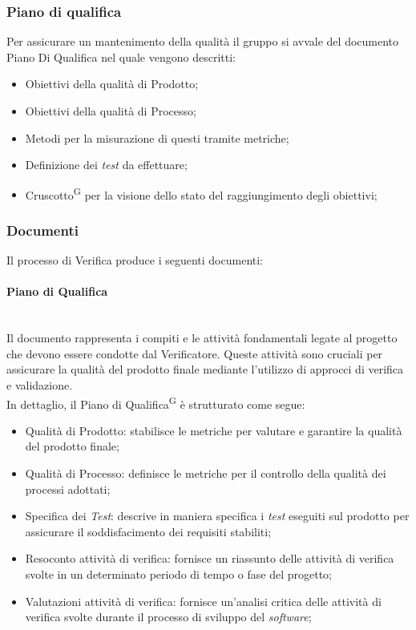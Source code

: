 \documentclass[5pt]{article}
\begin{document}
    \subsubsection{Piano di qualifica}
    Per assicurare un mantenimento della qualità il gruppo si avvale del documento Piano Di Qualifica nel quale vengono descritti:
    \begin{itemize}
		\item Obiettivi della qualità di Prodotto;
		\item Obiettivi della qualità di Processo;
		\item Metodi per la misurazione di questi tramite metriche;
		\item Definizione dei \textit{test} da effettuare;
		\item Cruscotto\textsuperscript{G} per la visione dello stato del raggiungimento degli obiettivi;
    \end{itemize}

\subsubsection{Documenti}
Il processo di Verifica produce i seguenti documenti:

\paragraph{Piano di Qualifica}~\\
Il documento rappresenta i compiti e le attività fondamentali legate al progetto che devono essere condotte dal Verificatore. Queste attività sono cruciali per assicurare la qualità del prodotto finale mediante l'utilizzo di approcci di verifica e validazione.\\
In dettaglio, il Piano di Qualifica\textsuperscript{G} è strutturato come segue:
\begin{itemize}
	\item Qualità di Prodotto: stabilisce le metriche per valutare e garantire la qualità del prodotto finale;
	\item Qualità di Processo: definisce le metriche per il controllo della qualità dei processi adottati;
	\item Specifica dei \textit{Test}: descrive in maniera specifica i \textit{test} eseguiti sul prodotto per assicurare il soddisfacimento dei requisiti stabiliti;
	\item Resoconto attività di verifica: fornisce un riassunto delle attività di verifica svolte in un determinato periodo di tempo o fase del progetto;
	\item Valutazioni attività di verifica: fornisce un'analisi critica delle attività di verifica svolte durante il processo di sviluppo del \textit{software};
\end{itemize}
\end{document}
